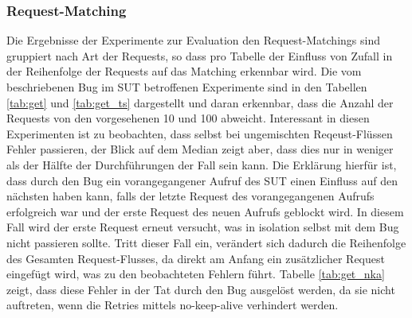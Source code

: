 \documentclass[12pt,a4paper]{report}
\begin{document}
\subsubsection{Request-Matching}
Die Ergebnisse der Experimente zur Evaluation den Request-Matchings sind gruppiert nach Art der Requests, so dass pro Tabelle
der Einfluss von Zufall in der Reihenfolge der Requests auf das Matching erkennbar wird. Die vom beschriebenen Bug im SUT
betroffenen Experimente sind in den Tabellen \ref{tab:get} und \ref{tab:get_ts} dargestellt und daran erkennbar, dass die Anzahl
der Requests von den vorgesehenen 10 und 100 abweicht. Interessant in diesen Experimenten ist zu beobachten, dass selbst bei
ungemischten Reqeust-Flüssen Fehler passieren, der Blick auf dem Median zeigt aber, dass dies nur in weniger als der Hälfte der
Durchführungen der Fall sein kann. Die Erklärung hierfür ist, dass durch den Bug ein vorangegangener Aufruf des SUT einen
Einfluss auf den nächsten haben kann, falls der letzte Request des vorangegangenen Aufrufs erfolgreich war und der erste Request
des neuen Aufrufs geblockt wird. In diesem Fall wird der erste Request erneut versucht, was in isolation selbst mit dem Bug
nicht passieren sollte. Tritt dieser Fall ein, verändert sich dadurch die Reihenfolge des Gesamten Request-Flusses, da direkt am
Anfang ein zusätzlicher Request eingefügt wird, was zu den beobachteten Fehlern führt. Tabelle \ref{tab:get_nka} zeigt, dass
diese Fehler in der Tat durch den Bug ausgelöst werden, da sie nicht auftreten, wenn die Retries mittels no-keep-alive
verhindert werden.
\end{document}
